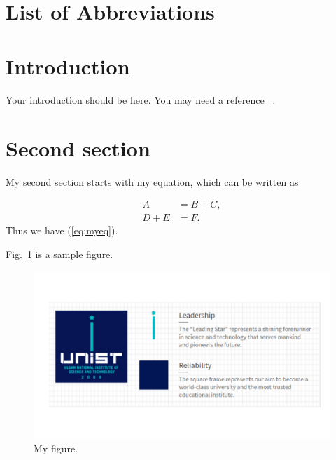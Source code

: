 \documentclass[11pt,a4paper,onecolumn,oneside]{report}
\begin{document}
\hbox{ }
\thispagestyle{empty}
\clearpage

\tableofcontents{}
\thispagestyle{empty}
\vfill
\clearpage

\listoffigures{}
\thispagestyle{empty}
\clearpage

\listoftables{}
\thispagestyle{empty}
\clearpage

\setcounter{page}{1}

    \section*{List of Abbreviations}
    \newpage

    \section{Introduction}

        Your introduction should be here. You may need a reference ~\cite{sample}.
    \newpage

    \section{Second section}
        My second section starts with my equation, which can be written as

        \begin{equation}\label{eq:myeq}
        \begin{split}
        	A 		&= B + C, \\
            D + E	&= F.
        \end{split}
        \end{equation}
        Thus we have (\ref{eq:myeq}).

        Fig.~\ref{fig:myfigure} is a sample figure.

        \begin{figure}[h]
            \centering
            \includegraphics[width=12 cm]{Figures/myfigure.pdf}
            \caption{My figure.}
            \label{fig:myfigure}
        \end{figure}
\end{document}
